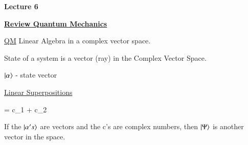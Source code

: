 
\usepackage{fancyhdr}

\fancyhf{}


\thispagestyle{fancy}

\begin{center}
{\huge \textbf{Lecture 6}}
\end{center}

{\fontsize{14}{16}\selectfont

\textbf{\underline{Review Quantum Mechanics}} 

\underline{QM} Linear Algebra in a complex vector space.

State of a system is a vector (ray) in the Complex Vector Space. 

\begin{center}
$\ket \alpha$  - state vector
\end{center}


\underline{Linear Superpositions} 

\be
\ket \Psi = c_1  + c_2 
\ee

If the $\ket{\alpha's}$ are vectors and the c's are complex numbers, then $\ket \Psi$ is another vector in the space.


}
